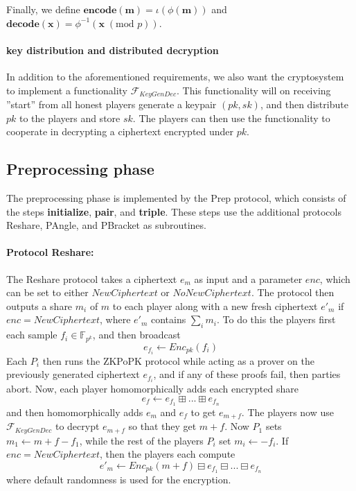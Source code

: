 \documentclass[../main.tex]{subfiles}
\begin{document}
Finally, we define $\textbf{encode}(\textbf{m}) = \iota(\phi(\textbf{m}))$ and $\textbf{decode}(\textbf{x}) = \phi^{-1}(\textbf{x} \; (\text{mod } p))$.

\paragraph{key distribution and distributed decryption}
In addition to the aforementioned requirements, we also want the cryptosystem to implement a functionality $\mathcal{F}_{KeyGenDec}$. This functionality will on receiving ''start'' from all honest players generate a keypair $(pk, sk)$, and then distribute $pk$ to the players and store $sk$. The players can then use the functionality to cooperate in decrypting a ciphertext encrypted under $pk$.

\subsection{Preprocessing phase} \label{subsection: Prep}
The preprocessing phase is implemented by the Prep protocol, which consists of the steps \textbf{initialize}, \textbf{pair}, and \textbf{triple}. These steps use the additional protocols Reshare, PAngle, and PBracket as subroutines.

\paragraph{Protocol Reshare:} The Reshare protocol takes a ciphertext $e_m$ as input and a parameter $enc$, which can be set to either $NewCiphertext$ or $NoNewCiphertext$. The protocol then outputs a share $m_i$ of $m$ to each player along with a new fresh ciphertext $e'_m$ if $enc = NewCiphertext$, where $e'_m$ contains $\sum_i m_i$.
To do this the players first each sample $f_i \in \mathbb{F}_{p^k}$, and then broadcast $$e_{f_i} \leftarrow Enc_{pk}(f_i)$$
Each $P_i$ then runs the ZKPoPK protocol while acting as a prover on the previously generated ciphertext $e_{f_i}$, and if any of these proofs fail, then parties abort.
Now, each player homomorphically adds each encrypted share
$$e_f \leftarrow e_{f_1} \boxplus ... \boxplus e_{f_n} $$
and then homomorphically adds $e_m$ and $e_f$ to get $e_{m + f}$. The players now use $\mathcal{F}_{KeyGenDec}$ to decrypt $e_{m + f}$ so that they get $m + f$. Now $P_1$ sets $m_1 \leftarrow m + f - f_1$, while the rest of the players $P_i$ set $m_i \leftarrow - f_i$.
If $enc = NewCiphertext$, then the players each compute
$$e'_m \leftarrow Enc_{pk}(m + f) \boxminus e_{f_1} \boxminus ... \boxminus e_{f_n}$$ where default randomness is used for the encryption.
\end{document}
